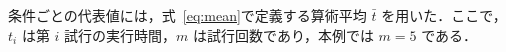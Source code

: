 条件ごとの代表値には，式~\eqref{eq:mean}で定義する算術平均 $\bar{t}$ を用いた．ここで，$t_i$ は第 $i$ 試行の実行時間，$m$ は試行回数であり，本例では $m=5$ である．
